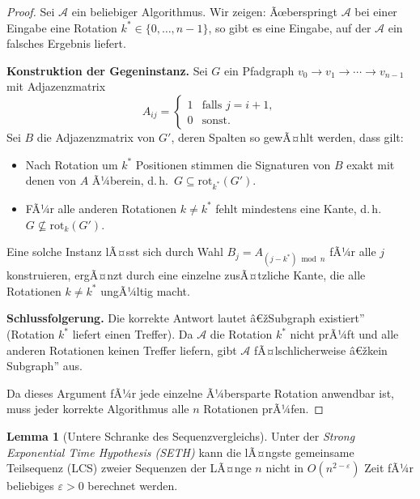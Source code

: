 ﻿\documentclass[a4paper,12pt]{article}
\theoremstyle{definition}
\newtheorem{lemma}{Lemma}
\begin{document}
\begin{proof}
Sei $\mathcal{A}$ ein beliebiger Algorithmus.
Wir zeigen: Ãœberspringt $\mathcal{A}$ bei einer Eingabe eine Rotation $k^* \in \{0,\ldots,n-1\}$, so gibt es eine Eingabe, auf der $\mathcal{A}$ ein falsches Ergebnis liefert.

\textbf{Konstruktion der Gegeninstanz.}
Sei $G$ ein Pfadgraph $v_0 \to v_1 \to \cdots \to v_{n-1}$ mit Adjazenzmatrix
\[
	A_{ij} = \begin{cases} 1 & \text{falls } j = i+1, \\ 0 & \text{sonst.} \end{cases}
\]
Sei $B$ die Adjazenzmatrix von $G'$, deren Spalten so gewÃ¤hlt werden, dass gilt:
\begin{itemize}
	\item Nach Rotation um $k^*$ Positionen stimmen die Signaturen von $B$ exakt mit denen von $A$ Ã¼berein, d.\,h.\ $G \subseteq \mathrm{rot}_{k^*}(G')$.
	\item FÃ¼r alle anderen Rotationen $k \ne k^*$ fehlt mindestens eine Kante, d.\,h.\ $G \not\subseteq \mathrm{rot}_k(G')$.
\end{itemize}
Eine solche Instanz lÃ¤sst sich durch Wahl $B_j = A_{(j - k^*) \bmod n}$ fÃ¼r alle $j$ konstruieren, ergÃ¤nzt durch eine einzelne zusÃ¤tzliche Kante, die alle Rotationen $k \ne k^*$ ungÃ¼ltig macht.

\textbf{Schlussfolgerung.}
Die korrekte Antwort lautet â€žSubgraph existiert'' (Rotation $k^*$ liefert einen Treffer).
Da $\mathcal{A}$ die Rotation $k^*$ nicht prÃ¼ft und alle anderen Rotationen keinen Treffer liefern, gibt $\mathcal{A}$ fÃ¤lschlicherweise â€žkein Subgraph'' aus.

Da dieses Argument fÃ¼r jede einzelne Ã¼bersparte Rotation anwendbar ist, muss jeder korrekte Algorithmus alle $n$ Rotationen prÃ¼fen.
\end{proof}

\begin{lemma}[Untere Schranke des Sequenzvergleichs]
\label{lem:lcs}
Unter der \emph{Strong Exponential Time Hypothesis (SETH)} kann die lÃ¤ngste gemeinsame Teil\-sequenz (LCS) zweier Sequenzen der LÃ¤nge $n$ nicht in $O(n^{2-\varepsilon})$ Zeit fÃ¼r beliebiges $\varepsilon > 0$ berechnet werden.
\end{lemma}
\end{document}
